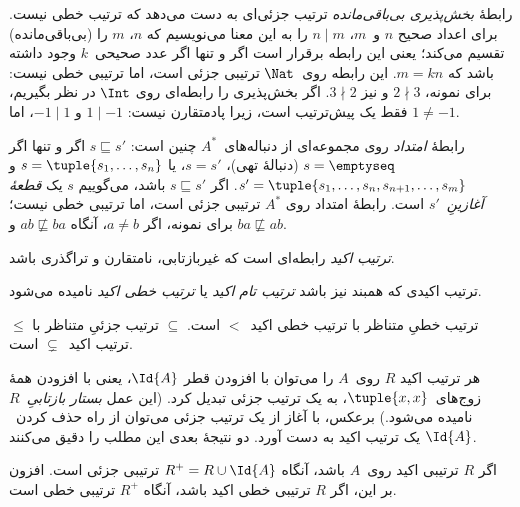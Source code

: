 \documentclass[../../../include/open-logic-section]{subfiles}
\begin{document}
\begin{ex}
رابطهٔ \emph{بخش‌پذیری بی‌باقی‌مانده} ترتیب جزئی‌ای به دست می‌دهد که
ترتیب خطی نیست. برای اعداد صحیح $n$ و~$m$، $n \mid m$ را به این معنا
می‌نویسیم که $n$، $m$ را (بی‌باقی‌مانده) تقسیم می‌کند؛ یعنی این رابطه
برقرار است اگر و تنها اگر عدد صحیحی~$k$ وجود داشته باشد که $m = kn$. این رابطه روی~$\Nat$
ترتیبی جزئی است، اما ترتیبی خطی نیست: برای نمونه، $2 \nmid 3$ و نیز
$3 \nmid
2$. اگر بخش‌پذیری را رابطه‌ای روی $\Int$ در نظر بگیریم، فقط یک
پیش‌ترتیب است، زیرا پادمتقارن نیست: $1 \mid -1$ و $-1 \mid 1$، اما
$1 \neq -1$.
\end{ex}

\begin{ex}
رابطهٔ \emph{امتداد} روی مجموعه‌ای از دنباله‌های~$A^*$ چنین است:
$s \sqsubseteq s'$ اگر و تنها اگر $s = \emptyseq$ (دنبالهٔ تهی)،
$s = s'$، یا $s = \tuple{s_1, \dots, s_n}$ و $s' =
\tuple{s_1, \dots, s_n, s_{n+1}, \dots, s_m}$. اگر $s \sqsubseteq s'$
باشد، می‌گوییم $s$ یک \emph{قطعهٔ آغازینِ}~$s'$ است. رابطهٔ امتداد
روی $A^*$ ترتیبی جزئی است، اما ترتیبی خطی نیست؛ برای نمونه، اگر
$a \neq b$، آنگاه $ab \not\sqsubseteq ba$ و $ba \not\sqsubseteq ab$.
\end{ex}

\begin{defn}
\emph{ترتیب اکید} رابطه‌ای است که غیربازتابی، نامتقارن و تراگذری باشد.
\end{defn}

\begin{defn}
ترتیب اکیدی که همبند نیز باشد \emph{ترتیب تام اکید} یا
\emph{ترتیب خطی اکید} نامیده می‌شود.
\end{defn}

\begin{ex}
$\le$ ترتیب خطیِ متناظر با ترتیب خطی اکید~$<$ است. $\subseteq$ ترتیب
جزئیِ متناظر با ترتیب اکید~$\subsetneq$ است.
\end{ex}

هر ترتیب اکید $R$ روی~$A$ را می‌توان با افزودن قطر $\Id{A}$، یعنی با
افزودن همهٔ زوج‌های~$\tuple{x,
x}$، به یک ترتیب جزئی تبدیل کرد. (این عمل \emph{بستار بازتابیِ}~$R$
نامیده می‌شود.) برعکس، با آغاز از یک ترتیب جزئی می‌توان از راه حذف
کردن~$\Id{A}$ یک ترتیب اکید به دست آورد. دو نتیجهٔ بعدی این مطلب را
دقیق می‌کنند.

\begin{prop}
اگر $R$ ترتیبی اکید روی~$A$ باشد، آنگاه $R^+ = R \cup \Id{A}$ ترتیبی
جزئی است. افزون بر این، اگر $R$ ترتیبی خطی اکید باشد، آنگاه $R^+$
ترتیبی خطی است.
\end{prop}
\end{document}
